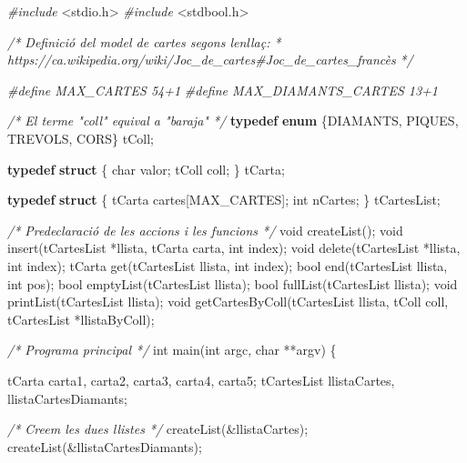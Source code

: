 \documentclass[]{book}
\newenvironment{Shaded}{\begin{snugshade}}{\end{snugshade}}
\newcommand{\CommentTok}[1]{\textcolor[rgb]{0.56,0.35,0.01}{\textit{#1}}}
\newcommand{\DataTypeTok}[1]{\textcolor[rgb]{0.13,0.29,0.53}{#1}}
\newcommand{\ImportTok}[1]{#1}
\newcommand{\KeywordTok}[1]{\textcolor[rgb]{0.13,0.29,0.53}{\textbf{#1}}}
\newcommand{\NormalTok}[1]{#1}
\newcommand{\PreprocessorTok}[1]{\textcolor[rgb]{0.56,0.35,0.01}{\textit{#1}}}
\begin{document}
\begin{Shaded}
\begin{Highlighting}[]
\PreprocessorTok{\#include }\ImportTok{\textless{}stdio.h\textgreater{}}
\PreprocessorTok{\#include }\ImportTok{\textless{}stdbool.h\textgreater{}}

\CommentTok{/* Definició del model de cartes segons l\textquotesingle{}enllaç:}
\CommentTok{ *  https://ca.wikipedia.org/wiki/Joc\_de\_cartes\#Joc\_de\_cartes\_francès }
\CommentTok{ */}

\PreprocessorTok{\#define MAX\_CARTES 54+1}
\PreprocessorTok{\#define MAX\_DIAMANTS\_CARTES 13+1}

\CommentTok{/* El terme "coll" equival a "baraja" */}
\KeywordTok{typedef} \KeywordTok{enum}\NormalTok{ \{DIAMANTS, PIQUES, TREVOLS, CORS\} tColl;}

\KeywordTok{typedef} \KeywordTok{struct}\NormalTok{ \{}
    \DataTypeTok{char}\NormalTok{ valor;}
\NormalTok{    tColl coll;}
\NormalTok{\} tCarta;}

\KeywordTok{typedef} \KeywordTok{struct}\NormalTok{ \{}
\NormalTok{    tCarta cartes[MAX\_CARTES];}
    \DataTypeTok{int}\NormalTok{ nCartes;}
\NormalTok{\} tCartesList;}

\CommentTok{/* Predeclaració de les accions i les funcions */}
\DataTypeTok{void}\NormalTok{ createList();}
\DataTypeTok{void}\NormalTok{ insert(tCartesList *llista, tCarta carta, }\DataTypeTok{int}\NormalTok{ index);}
\DataTypeTok{void}\NormalTok{ delete(tCartesList *llista, }\DataTypeTok{int}\NormalTok{ index);}
\NormalTok{tCarta get(tCartesList llista, }\DataTypeTok{int}\NormalTok{ index);}
\DataTypeTok{bool}\NormalTok{ end(tCartesList llista, }\DataTypeTok{int}\NormalTok{ pos);}
\DataTypeTok{bool}\NormalTok{ emptyList(tCartesList llista);}
\DataTypeTok{bool}\NormalTok{ fullList(tCartesList llista);}
\DataTypeTok{void}\NormalTok{ printList(tCartesList llista);}
\DataTypeTok{void}\NormalTok{ getCartesByColl(tCartesList llista, tColl coll, tCartesList *llistaByColl);}

\CommentTok{/* Programa principal */}
\DataTypeTok{int}\NormalTok{ main(}\DataTypeTok{int}\NormalTok{ argc, }\DataTypeTok{char}\NormalTok{ **argv) \{}

\NormalTok{    tCarta carta1, carta2, carta3, carta4, carta5;}
\NormalTok{    tCartesList llistaCartes, llistaCartesDiamants;}

    \CommentTok{/* Creem les dues llistes */}
\NormalTok{    createList(\&llistaCartes);}
\NormalTok{    createList(\&llistaCartesDiamants);}


\end{Highlighting}
\end{Shaded}
\end{document}
